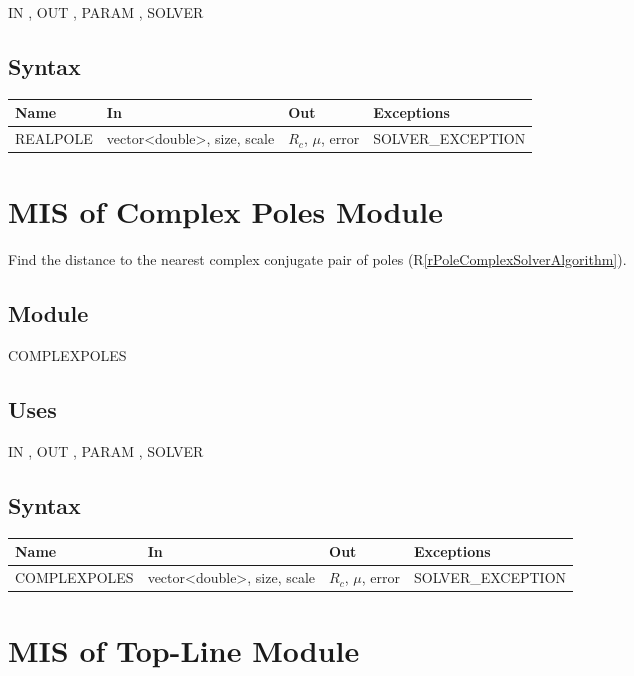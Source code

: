 \documentclass[12pt, titlepage]{article}
\newcommand{\rref}[1]{(R\ref{#1})}
\begin{document}
IN , OUT , PARAM , SOLVER 

\subsection{Syntax}

\begin{tabular}{p{3cm} p{5cm} p{3cm} >{\raggedright\arraybackslash}p{5cm}}
\toprule
\textbf{Name} & \textbf{In} & \textbf{Out} & \textbf{Exceptions} \\
\midrule
  REALPOLE & vector<double>, size, scale &  $R_c$, $\mu$, error & SOLVER\_EXCEPTION \\
\bottomrule
\end{tabular}

\section{MIS of Complex Poles Module} \label{sc:MIS_POLECOMPLEXSOLVERMODULE}

Find the distance to the nearest complex conjugate pair of poles \rref{rPoleComplexSolverAlgorithm}.

\subsection{Module}

COMPLEXPOLES

\subsection{Uses}

IN , OUT , PARAM , SOLVER 

\subsection{Syntax}

\begin{tabular}{p{3.5cm} p{5cm} p{3cm} >{\raggedright\arraybackslash}p{5cm}}
\toprule
\textbf{Name} & \textbf{In} & \textbf{Out} & \textbf{Exceptions} \\
\midrule
  COMPLEXPOLES & vector<double>, size, scale &  $R_c$, $\mu$, error & SOLVER\_EXCEPTION \\
\bottomrule
\end{tabular}

\section{MIS of Top-Line Module} \label{sc:MIS_POLETOPLINEMODULE}
\end{document}

